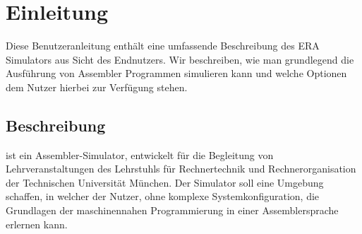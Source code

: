 
\section{Einleitung}

Diese Benutzeranleitung enthält eine umfassende Beschreibung des ERA Simulators
aus Sicht des Endnutzers. Wir beschreiben, wie man grundlegend die Ausführung
von Assembler Programmen simulieren kann und welche Optionen dem Nutzer hierbei
zur Verfügung stehen.

\subsection{Beschreibung}

\erasim{} ist ein Assembler-Simulator, entwickelt für die Begleitung von
Lehrveranstaltungen des Lehrstuhls für Rechnertechnik und Rechnerorganisation
der Technischen Universität München. Der Simulator soll eine Umgebung schaffen,
in welcher der Nutzer, ohne komplexe Systemkonfiguration, die
Grundlagen der maschinennahen Programmierung in einer Assemblersprache erlernen
kann.


